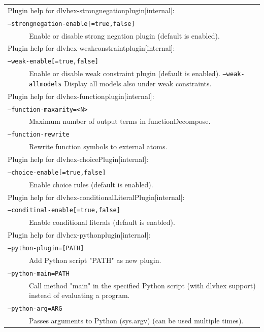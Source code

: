 \documentclass[a4paper, titlepage]{article}
\begin{document}
\begin{center}
\begin{longtable}{p{2.2cm}  p{2.5cm} p{0.6cm} p{6.3cm}  }
\multicolumn{4}{l}{Plugin help for dlvhex-strongnegationplugin[internal]:}\\
\multicolumn{4}{l}{\texttt{--strongnegation-enable[=true,false]}}\\
& & & Enable or disable strong negation plugin (default is enabled).\\ 
\multicolumn{4}{l}{Plugin help for dlvhex-weakconstraintplugin[internal]:}\\
\multicolumn{4}{l}{\texttt{--weak-enable[=true,false]}}\\
& & & Enable or disable weak constraint plugin (default is enabled). \texttt{--weak-allmodels} Display all models also under weak constraints.\\ 
\multicolumn{4}{l}{Plugin help for dlvhex-functionplugin[internal]:}\\
\multicolumn{4}{l}{\texttt{--function-maxarity=<N>}}\\
& & & Maximum number of output terms in functionDecompose.\\ 
\multicolumn{4}{l}{\texttt{--function-rewrite}}\\
& & & Rewrite function symbols to external atoms.\\ 
\multicolumn{4}{l}{Plugin help for dlvhex-choicePlugin[internal]:}\\
\multicolumn{4}{l}{\texttt{--choice-enable[=true,false]}}\\
& & & Enable choice rules (default is enabled).\\
\multicolumn{4}{l}{Plugin help for dlvhex-conditionalLiteralPlugin[internal]:}\\
\multicolumn{4}{l}{\texttt{--conditinal-enable[=true,false]}}\\
& & & Enable conditional literals (default is enabled).\\
\multicolumn{4}{l}{Plugin help for dlvhex-pythonplugin[internal]:}\\
\multicolumn{4}{l}{\texttt{--python-plugin=[PATH]}}\\
& & & Add Python script "PATH" as new plugin.\\
\multicolumn{4}{l}{\texttt{--python-main=PATH}}\\
& & & Call method "main" in the specified Python script (with dlvhex support) instead of evaluating a program.\\
\multicolumn{4}{l}{\texttt{--python-arg=ARG}}\\
& & &Passes arguments to Python (sys.argv) (can be used multiple times).\\
\end{longtable}
\end{center}
\end{document}
